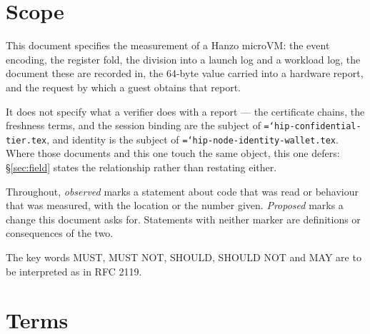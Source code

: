 \documentclass[11pt,a4paper]{article}
\newcommand{\code}[1]{\texttt{\hyphenchar\font=`\-\relax #1}}
\begin{document}
\section{Scope}
\label{sec:scope}

This document specifies the measurement of a Hanzo microVM: the event encoding,
the register fold, the division into a launch log and a workload log, the
document these are recorded in, the 64-byte value carried into a hardware report,
and the request by which a guest obtains that report.

It does not specify what a verifier does with a report --- the certificate chains,
the freshness terms, and the session binding are the subject of
\code{hip-confidential-tier.tex}, and identity is the subject of
\code{hip-node-identity-wallet.tex}. Where those documents and this one touch the
same object, this one defers: \S\ref{sec:field} states the relationship rather
than restating either.

Throughout, \emph{observed} marks a statement about code that was read or
behaviour that was measured, with the location or the number given. \emph{Proposed}
marks a change this document asks for. Statements with neither marker are
definitions or consequences of the two.

The key words MUST, MUST NOT, SHOULD, SHOULD NOT and MAY are to be interpreted as
in RFC 2119.

\section{Terms}
\label{sec:terms}
\end{document}
